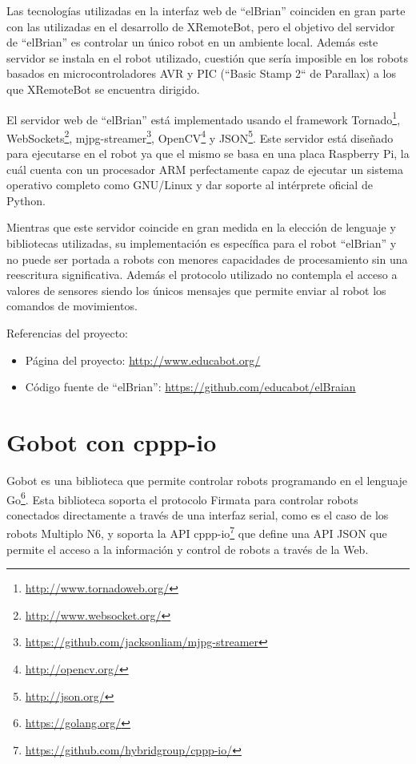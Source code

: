 Las tecnologías utilizadas en la interfaz web de ``elBrian'' coinciden en gran
parte con las utilizadas en el desarrollo de XRemoteBot, pero el objetivo del
servidor de ``elBrian'' es controlar un único robot en un ambiente local.
Además este servidor
se instala en el robot utilizado,  cuestión que sería imposible en los
robots basados en
microcontroladores AVR y PIC (``Basic Stamp 2`` de Parallax)
a los que XRemoteBot se encuentra dirigido.

El servidor web de ``elBrian'' está implementado usando el framework
Tornado\footnote{\url{http://www.tornadoweb.org/}},
WebSockets\footnote{\url{http://www.websocket.org/}},
mjpg-streamer\footnote{\url{https://github.com/jacksonliam/mjpg-streamer}},
OpenCV\footnote{\url{http://opencv.org/}}
y JSON\footnote{\url{http://json.org/}}.
Este servidor está diseñado para ejecutarse
en el robot ya que el mismo se basa en una placa Raspberry Pi, la cuál
cuenta con un procesador ARM perfectamente capaz de ejecutar un sistema
operativo completo como GNU/Linux y dar soporte al intérprete oficial de
Python.

Mientras que este servidor coincide en gran medida en la elección de lenguaje
y bibliotecas utilizadas, su implementación es específica para el robot ``elBrian''
y no puede ser portada a robots con menores capacidades de procesamiento
sin una reescritura significativa. Además el protocolo utilizado no contempla
el acceso a valores de sensores siendo los únicos mensajes que permite enviar
al robot los comandos de movimientos.

Referencias del proyecto:
\begin{itemize}
    \item Página del proyecto: \url{http://www.educabot.org/}
    \item Código fuente de ``elBrian'': \url{https://github.com/educabot/elBraian}
\end{itemize}

\section{Gobot con cppp-io}

Gobot
es una biblioteca que permite controlar robots programando en el lenguaje
Go\footnote{\url{https://golang.org/}}. Esta biblioteca soporta el
protocolo Firmata
para controlar robots
conectados directamente a través de una interfaz serial, como es el caso
de los robots Multiplo N6, y soporta la API
cppp-io\footnote{\url{https://github.com/hybridgroup/cppp-io/}}
que define una API JSON
que permite el acceso a la información y control de robots a través de la Web.

